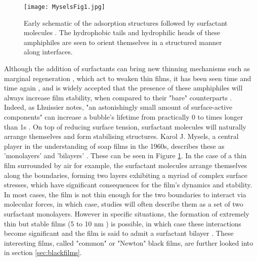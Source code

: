 \documentclass[a4paper,12pt]{article}
\numberwithin{equation}{section}
\numberwithin{figure}{section}
\numberwithin{table}{section}
\begin{document}
\begin{figure}[!htbp]
    \centering
    \captionsetup{width=.9\linewidth}
    \texttt{[image: MyselsFig1.jpg]}
    \caption{Early schematic of the adsorption structures followed by surfactant molecules \cite{Mysels1968Nomenclature}. The hydrophobic tails and hydrophilic heads of these amphiphiles are seen to orient themselves in a structured manner along interfaces.}
    \label{fig:Mysels1}
\end{figure}

Although the addition of surfactants can bring new thinning mechanisms such as marginal regeneration \cite{Mysels1959Book, Nierstrasz1999}, which act to weaken thin films, it has been seen time and time again \cite{Bhamla2017, ChampougnyNotBare2016, Modini2013, Lhuissier2011, Pfeiffer2020}, and is widely accepted that the presence of these amphiphiles will always increase film stability, when compared to their "bare" counterparts \cite{Debregeas1998}. Indeed, as Lhuissier notes, "an astonishingly small amount of surface-active components" can increase a bubble's lifetime from practically 0 to times longer than 1s \cite{Lhuissier2011, Breward2002}. On top of reducing surface tension, surfactant molecules will naturally arrange themselves and form stabilising structures. Karol J. Mysels, a central player in the understanding of soap films in the 1960s, describes these as 'monolayers' and 'bilayers' \cite{Mysels1968Nomenclature}. These can be seen in Figure \ref{fig:Mysels1}. In the case of a thin film surrounded by air for example, the surfactant molecules arrange themselves along the boundaries, forming two layers exhibiting a myriad of complex surface stresses, which have significant consequences for the film's dynamics and stability. In most cases, the film is not thin enough for the two boundaries to interact via molecular forces, in which case, studies will often describe them as a set of two surfactant monolayers. However in specific situations, the formation of extremely thin but stable films (5 to 10 nm \cite{Seung2006}) is possible, in which case these interactions become significant and the film is said to admit a surfactant bilayer \cite{Vrij1968, Breward2002, Cantat2010}. These interesting films, called "common" or "Newton" black films, are further looked into in section \ref{sec:blackfilms}.
\end{document}
